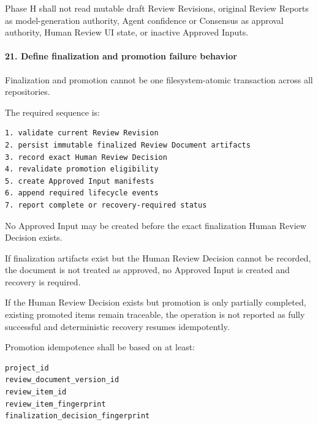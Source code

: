 \begin{Shaded}
\begin{Highlighting}[]
\NormalTok{) }\OperatorTok{{-}\textgreater{}} \NormalTok{[ApprovedInputManifest, ...]}
\end{Highlighting}
\end{Shaded}

Phase H shall not read mutable draft Review Revisions, original Review Reports as model-generation authority, Agent confidence or Consensus as approval authority, Human Review UI state, or inactive Approved Inputs.

\hypertarget{21-define-finalization-and-promotion-failure-behavior}{%
\paragraph{21. Define finalization and promotion failure behavior}\label{21-define-finalization-and-promotion-failure-behavior}}

Finalization and promotion cannot be one filesystem-atomic transaction across all repositories.

The required sequence is:

\begin{verbatim}
1. validate current Review Revision
2. persist immutable finalized Review Document artifacts
3. record exact Human Review Decision
4. revalidate promotion eligibility
5. create Approved Input manifests
6. append required lifecycle events
7. report complete or recovery-required status
\end{verbatim}

No Approved Input may be created before the exact finalization Human Review Decision exists.

If finalization artifacts exist but the Human Review Decision cannot be recorded, the document is not treated as approved, no Approved Input is created and recovery is required.

If the Human Review Decision exists but promotion is only partially completed, existing promoted items remain traceable, the operation is not reported as fully successful and deterministic recovery resumes idempotently.

Promotion idempotence shall be based on at least:

\begin{verbatim}
project_id
review_document_version_id
review_item_id
review_item_fingerprint
finalization_decision_fingerprint
\end{verbatim}

